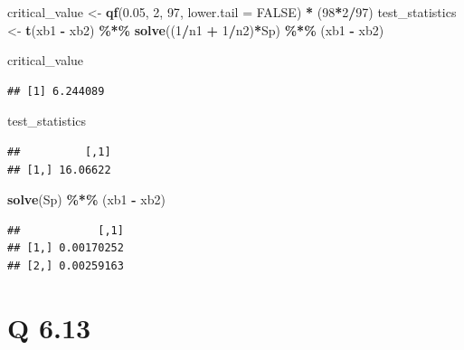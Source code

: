 \documentclass[
]{article}
\newenvironment{Shaded}{\begin{snugshade}}{\end{snugshade}}
\newcommand{\AttributeTok}[1]{\textcolor[rgb]{0.13,0.29,0.53}{#1}}
\newcommand{\ConstantTok}[1]{\textcolor[rgb]{0.56,0.35,0.01}{#1}}
\newcommand{\DecValTok}[1]{\textcolor[rgb]{0.00,0.00,0.81}{#1}}
\newcommand{\FloatTok}[1]{\textcolor[rgb]{0.00,0.00,0.81}{#1}}
\newcommand{\FunctionTok}[1]{\textcolor[rgb]{0.13,0.29,0.53}{\textbf{#1}}}
\newcommand{\NormalTok}[1]{#1}
\newcommand{\OtherTok}[1]{\textcolor[rgb]{0.56,0.35,0.01}{#1}}
\newcommand{\SpecialCharTok}[1]{\textcolor[rgb]{0.81,0.36,0.00}{\textbf{#1}}}
\begin{document}
\begin{Shaded}
\begin{Highlighting}[]
\NormalTok{critical\_value }\OtherTok{\textless{}{-}} \FunctionTok{qf}\NormalTok{(}\FloatTok{0.05}\NormalTok{, }\DecValTok{2}\NormalTok{, }\DecValTok{97}\NormalTok{, }\AttributeTok{lower.tail =} \ConstantTok{FALSE}\NormalTok{) }\SpecialCharTok{*}\NormalTok{ (}\DecValTok{98}\SpecialCharTok{*}\DecValTok{2}\SpecialCharTok{/}\DecValTok{97}\NormalTok{)}
\NormalTok{test\_statistics }\OtherTok{\textless{}{-}} \FunctionTok{t}\NormalTok{(xb1 }\SpecialCharTok{{-}}\NormalTok{ xb2) }\SpecialCharTok{\%*\%} \FunctionTok{solve}\NormalTok{((}\DecValTok{1}\SpecialCharTok{/}\NormalTok{n1 }\SpecialCharTok{+} \DecValTok{1}\SpecialCharTok{/}\NormalTok{n2)}\SpecialCharTok{*}\NormalTok{Sp) }\SpecialCharTok{\%*\%}\NormalTok{ (xb1 }\SpecialCharTok{{-}}\NormalTok{ xb2)}
\end{Highlighting}
\end{Shaded}

\begin{Shaded}
\begin{Highlighting}[]
\NormalTok{critical\_value}
\end{Highlighting}
\end{Shaded}

\begin{verbatim}
## [1] 6.244089
\end{verbatim}

\begin{Shaded}
\begin{Highlighting}[]
\NormalTok{test\_statistics}
\end{Highlighting}
\end{Shaded}

\begin{verbatim}
##          [,1]
## [1,] 16.06622
\end{verbatim}

\begin{Shaded}
\begin{Highlighting}[]
\FunctionTok{solve}\NormalTok{(Sp) }\SpecialCharTok{\%*\%}\NormalTok{ (xb1 }\SpecialCharTok{{-}}\NormalTok{ xb2)}
\end{Highlighting}
\end{Shaded}

\begin{verbatim}
##            [,1]
## [1,] 0.00170252
## [2,] 0.00259163
\end{verbatim}

\section{Q 6.13}\label{q-6.13}
\end{document}
